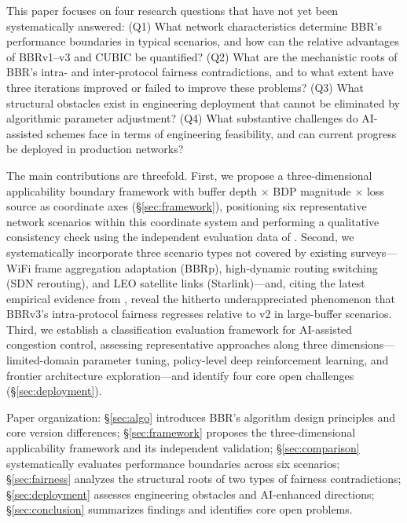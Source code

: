 \documentclass[a4paper,fleqn]{cas-sc}
\begin{document}
This paper focuses on four research questions that have not yet been
systematically answered: (Q1) What network characteristics determine BBR's
performance boundaries in typical scenarios, and how can the relative
advantages of BBRv1--v3 and CUBIC be quantified? (Q2) What are the mechanistic
roots of BBR's intra- and inter-protocol fairness contradictions, and to what
extent have three iterations improved or failed to improve these problems?
(Q3) What structural obstacles exist in engineering deployment that cannot be
eliminated by algorithmic parameter adjustment? (Q4) What substantive challenges
do AI-assisted schemes face in terms of engineering feasibility, and can current
progress be deployed in production networks?

The main contributions are threefold. First, we propose a three-dimensional
applicability boundary framework with buffer depth $\times$ BDP magnitude
$\times$ loss source as coordinate axes (\S\ref{sec:framework}), positioning
six representative network scenarios within this coordinate system and performing
a qualitative consistency check using the independent evaluation data of
\citet{scholz2018deeper}. Second, we systematically incorporate three scenario
types not covered by existing surveys---WiFi frame aggregation adaptation (BBRp),
high-dynamic routing switching (SDN rerouting), and LEO satellite links
(Starlink)---and, citing the latest empirical evidence from
\citet{piotrowska2024}, reveal the hitherto underappreciated phenomenon that
BBRv3's intra-protocol fairness regresses relative to v2 in large-buffer
scenarios. Third, we establish a classification evaluation framework for
AI-assisted congestion control, assessing representative approaches along three
dimensions---limited-domain parameter tuning, policy-level deep reinforcement
learning, and frontier architecture exploration---and identify four core open
challenges (\S\ref{sec:deployment}).

Paper organization: \S\ref{sec:algo} introduces BBR's algorithm design
principles and core version differences; \S\ref{sec:framework} proposes the
three-dimensional applicability framework and its independent validation;
\S\ref{sec:comparison} systematically evaluates performance boundaries across
six scenarios; \S\ref{sec:fairness} analyzes the structural roots of two types
of fairness contradictions; \S\ref{sec:deployment} assesses engineering obstacles
and AI-enhanced directions; \S\ref{sec:conclusion} summarizes findings and
identifies core open problems.

\end{document}
